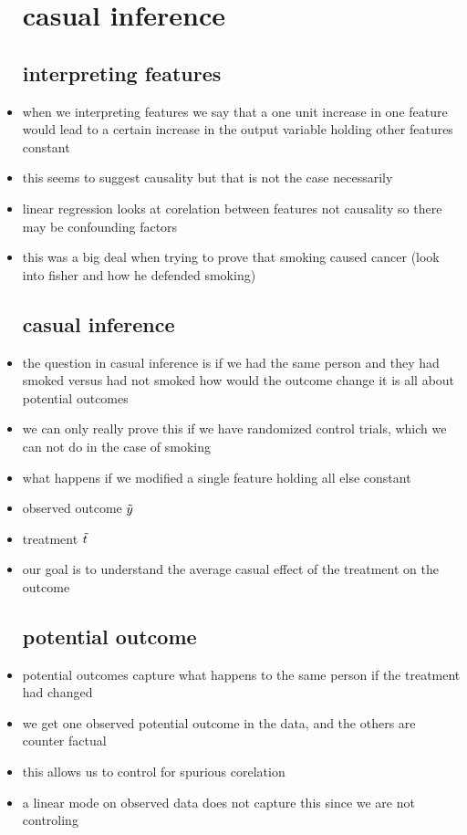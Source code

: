\documentclass{article}
\begin{document}
\begin{itemize}
 \section{casual inference}
 \subsection*{interpreting features}
 \item when we interpreting features we say that a one unit increase in one feature would lead to a certain 
 increase in the output variable holding other features constant
 \item this seems to suggest causality but that is not the case necessarily  
\item linear regression looks at corelation between features not causality so there may be confounding factors
\item this was a big deal when trying to prove that smoking caused cancer (look into fisher and how he defended smoking)
\subsection*{casual inference}
\item the question in casual inference is if we had the same person and they had smoked versus had not smoked how would 
the outcome change it is all about potential outcomes
\item we can only really prove this if we have randomized control trials, which we can not do in the case of smoking 
\item what happens if we modified a single feature holding all else constant 
\item observed outcome $\Tilde{y}$
\item treatment $\Tilde{t}$
\item our goal is to understand the average casual effect of the treatment on the outcome
\subsection*{potential outcome}
\item potential outcomes capture what happens to the same person if the treatment had changed
\item we get one observed potential outcome in the data, and the others are counter factual 
\item this allows us to control for spurious  corelation
\item a linear mode on observed data does not capture this since we are not controling 

\end{itemize}
\end{document}

